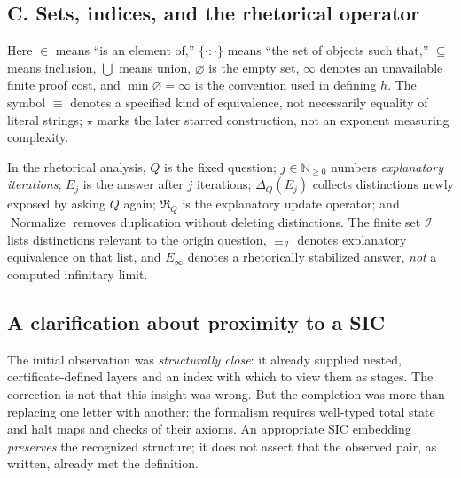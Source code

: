 \documentclass[11pt,letterpaper]{article}
\begin{document}
\subsection*{C. Sets, indices, and the rhetorical operator}
Here $\in$ means ``is an element of,'' $\{\cdot:\cdot\}$ means ``the set of objects such that,'' $\subseteq$ means inclusion, $\bigcup$ means union, $\varnothing$ is the empty set, $\infty$ denotes an unavailable finite proof cost, and $\min\varnothing=\infty$ is the convention used in defining $h$. The symbol $\equiv$ denotes a specified kind of equivalence, not necessarily equality of literal strings; $\star$ marks the later starred construction, not an exponent measuring complexity.

In the rhetorical analysis, $Q$ is the fixed question; $j\in\mathbb N_{\ge0}$ numbers \emph{explanatory iterations}; $E_j$ is the answer after $j$ iterations; $\Delta_Q(E_j)$ collects distinctions newly exposed by asking $Q$ again; $\mathfrak R_Q$ is the explanatory update operator; and $\operatorname{Normalize}$ removes duplication without deleting distinctions. The finite set $\mathcal I$ lists distinctions relevant to the origin question, $\equiv_{\mathcal I}$ denotes explanatory equivalence on that list, and $E_\infty$ denotes a rhetorically stabilized answer, \emph{not} a computed infinitary limit.

\subsection*{A clarification about proximity to a SIC}
The initial observation was \emph{structurally close}: it already supplied nested, certificate-defined layers and an index with which to view them as stages. The correction is not that this insight was wrong. But the completion was more than replacing one letter with another: the formalism requires well-typed total state and halt maps and checks of their axioms. An appropriate SIC embedding \emph{preserves} the recognized structure; it does not assert that the observed pair, as written, already met the definition.
\end{document}
